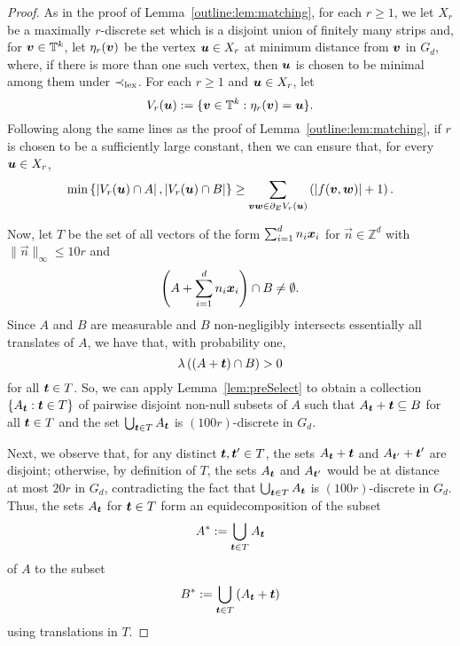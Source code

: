 \documentclass[12pt,a4paper]{amsart}
\numberwithin{equation}{section}
\theoremstyle{definition}
\begin{document}
\begin{proof}
As in the proof of Lemma~\ref{outline:lem:matching}, for each $r\geq1$, we let $X_r$ be a maximally $r$-discrete set which is a disjoint union of finitely many strips and, for $\boldsymbol{v}\in \mathbb{T}^k$, let $\eta_r(\boldsymbol{v})$ be the vertex $\boldsymbol{u}\in X_r$ at minimum distance from $\boldsymbol{v}$ in $G_d$, where, if there is more than one such vertex, then $\boldsymbol{u}$ is chosen to be minimal among them under $\prec_{\operatorname{lex}}$. For each $r\geq1$ and $\boldsymbol{u}\in X_r$, let
\[V_r(\boldsymbol{u}):=\{\boldsymbol{v}\in\mathbb{T}^k:\eta_r(\boldsymbol{v})=\boldsymbol{u}\}.\]
Following along the same lines as the proof of Lemma~\ref{outline:lem:matching}, if $r$ is chosen to be a sufficiently large constant, then we can ensure that, for every $\boldsymbol{u}\in X_r$, 
\begin{equation}\label{eq:enoughAB}\min\left\{\left|V_r(\boldsymbol{u})\cap A\right|,\left|V_r(\boldsymbol{u})\cap B\right|\right\} \geq \sum_{\boldsymbol{v}\boldsymbol{w}\in \partial_EV_r(\boldsymbol{u})}\left(|f(\boldsymbol{v},\boldsymbol{w})|+1\right).\end{equation}

Now, let $T$ be the set of all vectors of the form $\sum_{i=1}^dn_i\boldsymbol{x}_i$ for $\vec{n}\in \mathbb{Z}^d$ with $\|\vec{n}\|_\infty \leq 10r$ and
\[\left(A + \sum_{i=1}^dn_i\boldsymbol{x}_i\right)\cap B\neq \emptyset.\]
Since $A$ and $B$ are measurable and $B$ non-negligibly intersects essentially all translates of $A$, we have that, with probability one,
\[\lambda\left((A+\boldsymbol{t})\cap B\right)>0\]
for all $\boldsymbol{t}\in T$.  So, we can apply Lemma~\ref{lem:preSelect} to obtain a collection $\{A_{\boldsymbol{t}}: \boldsymbol{t}\in T\}$ of pairwise disjoint non-null subsets of $A$ such that $A_{\boldsymbol{t}}+\boldsymbol{t}\subseteq B$ for all $\boldsymbol{t}\in T$ and the set $\bigcup_{\boldsymbol{t}\in T}A_{\boldsymbol{t}}$ is $(100r)$-discrete in $G_d$. 

Next, we observe that, for any distinct $\boldsymbol{t},\boldsymbol{t}'\in T$, the sets $A_{\boldsymbol{t}}+\boldsymbol{t}$ and $A_{\boldsymbol{t}'}+\boldsymbol{t}'$ are disjoint; otherwise, by definition of $T$, the sets $A_{\boldsymbol{t}}$ and $A_{\boldsymbol{t}'}$ would be at distance at most $20r$ in $G_d$, contradicting the fact that $\bigcup_{\boldsymbol{t}\in T}A_{\boldsymbol{t}}$ is $(100r)$-discrete in $G_d$. Thus, the sets $A_{\boldsymbol{t}}$ for $\boldsymbol{t}\in T$ form an equidecomposition of the subset
\[A^*:=\bigcup_{\boldsymbol{t}\in T}A_{\boldsymbol{t}}\]
of $A$ to the subset 
\[B^*:=\bigcup_{\boldsymbol{t}\in T}\left(A_{\boldsymbol{t}}+\boldsymbol{t}\right)\]
using translations in $T$.


\end{proof}
\end{document}
